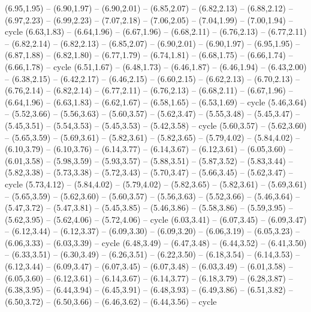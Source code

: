 \expandafter\def\csname geo:gebiet:ZWE\endcsname{
  (6.95,1.95) -- (6.90,1.97) -- (6.90,2.01) -- (6.85,2.07) -- (6.82,2.13) -- (6.88,2.12) -- (6.97,2.23) -- (6.99,2.23) -- (7.07,2.18) -- (7.06,2.05) -- (7.04,1.99) -- (7.00,1.94) -- cycle}
\expandafter\def\csname geo:gebiet:BWA\endcsname{
  (6.63,1.83) -- (6.64,1.96) -- (6.67,1.96) -- (6.68,2.11) -- (6.76,2.13) -- (6.77,2.11) -- (6.82,2.14) -- (6.82,2.13) -- (6.85,2.07) -- (6.90,2.01) -- (6.90,1.97) -- (6.95,1.95) -- (6.87,1.88) -- (6.82,1.80) -- (6.77,1.79) -- (6.74,1.81) -- (6.68,1.75) -- (6.66,1.74) -- (6.66,1.78) -- cycle}
\expandafter\def\csname geo:gebiet:NAM\endcsname{
  (6.51,1.67) -- (6.48,1.73) -- (6.46,1.87) -- (6.46,1.94) -- (6.43,2.00) -- (6.38,2.15) -- (6.42,2.17) -- (6.46,2.15) -- (6.60,2.15) -- (6.62,2.13) -- (6.70,2.13) -- (6.76,2.14) -- (6.82,2.14) -- (6.77,2.11) -- (6.76,2.13) -- (6.68,2.11) -- (6.67,1.96) -- (6.64,1.96) -- (6.63,1.83) -- (6.62,1.67) -- (6.58,1.65) -- (6.53,1.69) -- cycle}
\expandafter\def\csname geo:gebiet:SEN\endcsname{
  (5.46,3.64) -- (5.52,3.66) -- (5.56,3.63) -- (5.60,3.57) -- (5.62,3.47) -- (5.55,3.48) -- (5.45,3.47) -- (5.45,3.51) -- (5.54,3.53) -- (5.45,3.53) -- (5.42,3.58) -- cycle}
\expandafter\def\csname geo:gebiet:MLI\endcsname{
  (5.60,3.57) -- (5.62,3.60) -- (5.65,3.59) -- (5.69,3.61) -- (5.82,3.61) -- (5.82,3.65) -- (5.79,4.02) -- (5.84,4.02) -- (6.10,3.79) -- (6.10,3.76) -- (6.14,3.77) -- (6.14,3.67) -- (6.12,3.61) -- (6.05,3.60) -- (6.01,3.58) -- (5.98,3.59) -- (5.93,3.57) -- (5.88,3.51) -- (5.87,3.52) -- (5.83,3.44) -- (5.82,3.38) -- (5.73,3.38) -- (5.72,3.43) -- (5.70,3.47) -- (5.66,3.45) -- (5.62,3.47) -- cycle}
\expandafter\def\csname geo:gebiet:MRT\endcsname{
  (5.73,4.12) -- (5.84,4.02) -- (5.79,4.02) -- (5.82,3.65) -- (5.82,3.61) -- (5.69,3.61) -- (5.65,3.59) -- (5.62,3.60) -- (5.60,3.57) -- (5.56,3.63) -- (5.52,3.66) -- (5.46,3.64) -- (5.47,3.72) -- (5.47,3.81) -- (5.45,3.85) -- (5.46,3.86) -- (5.58,3.86) -- (5.59,3.95) -- (5.62,3.95) -- (5.62,4.06) -- (5.72,4.06) -- cycle}
\expandafter\def\csname geo:gebiet:BEN\endcsname{
  (6.03,3.41) -- (6.07,3.45) -- (6.09,3.47) -- (6.12,3.44) -- (6.12,3.37) -- (6.09,3.30) -- (6.09,3.20) -- (6.06,3.19) -- (6.05,3.23) -- (6.06,3.33) -- (6.03,3.39) -- cycle}
\expandafter\def\csname geo:gebiet:NER\endcsname{
  (6.48,3.49) -- (6.47,3.48) -- (6.44,3.52) -- (6.41,3.50) -- (6.33,3.51) -- (6.30,3.49) -- (6.26,3.51) -- (6.22,3.50) -- (6.18,3.54) -- (6.14,3.53) -- (6.12,3.44) -- (6.09,3.47) -- (6.07,3.45) -- (6.07,3.48) -- (6.03,3.49) -- (6.01,3.58) -- (6.05,3.60) -- (6.12,3.61) -- (6.14,3.67) -- (6.14,3.77) -- (6.18,3.79) -- (6.28,3.87) -- (6.38,3.95) -- (6.44,3.94) -- (6.45,3.91) -- (6.48,3.93) -- (6.49,3.86) -- (6.51,3.82) -- (6.50,3.72) -- (6.50,3.66) -- (6.46,3.62) -- (6.44,3.56) -- cycle}
